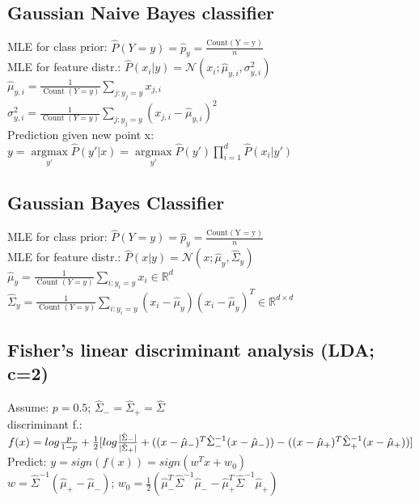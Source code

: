 \subsection*{Gaussian Naive Bayes classifier}
MLE for class prior: $\hat{P}(Y=y) = \hat{p}_y = \frac{\operatorname{Count(Y = y)}}{n}$\\
MLE for feature distr.: $\hat{P}(x_i|y) =  \mathcal{N}(x_i;\hat{\mu}_{y,i}, \sigma_{y,i}^2)$\\
$\hat{\mu}_{y,i} = \frac{1}{\operatorname{Count}(Y=y)} \sum_{j:y_j=y} x_{j,i}$\\
$\sigma_{y,i}^2 = \frac{1}{\operatorname{Count}(Y=y)} \sum_{j:y_j=y} (x_{j,i} - \hat{\mu}_{y,i})^2$\\
Prediction given new point x:\\
$y = \underset{y'}{\operatorname{argmax}} \hat{P}(y'|x) = \underset{y'}{\operatorname{argmax}} \hat{P}(y') \prod_{i=1}^d \hat{P}(x_i|y')$

\subsection*{Gaussian Bayes Classifier}
MLE for class prior: $\hat{P}(Y=y) = \hat{p}_y = \frac{\operatorname{Count(Y = y)}}{n}$\\
MLE for feature distr.: $\hat{P}(x|y) = \mathcal{N}(x ; \hat{\mu}_y, \hat{\Sigma}_y)$\\
$\hat{\mu}_{y} = \frac{1}{\operatorname{Count}(Y=y)} \sum_{i:y_i=y} x_i \in \mathbb{R}^d$\\
$\hat{\Sigma}_{y} = \frac{1}{\operatorname{Count}(Y=y)} \sum_{i:y_i=y} (x_i - \hat{\mu}_{y})(x_i-\hat{\mu}_y)^T \in \mathbb{R}^{d \times d}$

\subsection*{Fisher's linear discriminant analysis (LDA; c=2)}
Assume: $p = 0.5$; $\hat{\Sigma}_- = \hat{\Sigma}_+ = \hat{\Sigma}$\\
discriminant f.: $f(x) = log \frac{p}{1-p} + \frac{1}{2}[log \frac{|\hat{\Sigma}_-|}{|\hat{\Sigma}_+|}\\
+ ((x - \hat{\mu}_-)^T \hat{\Sigma}_-^{-1} (x - \hat{\mu}_-)) - ((x - \hat{\mu}_+)^T \hat{\Sigma}_+^{-1} (x - \hat{\mu}_+))]$\\
Predict: $y = sign(f(x)) = sign (w^T x + w_0)$\\
$w = \hat{\Sigma}^{-1}(\hat{\mu}_+ - \hat{\mu}_-)$; $w_0 = \frac{1}{2}(\hat{\mu}_-^T\hat{\Sigma}^{-1}\hat{\mu}_- - \hat{\mu}_+^T \hat{\Sigma}^{-1}\hat{\mu}_+)$

